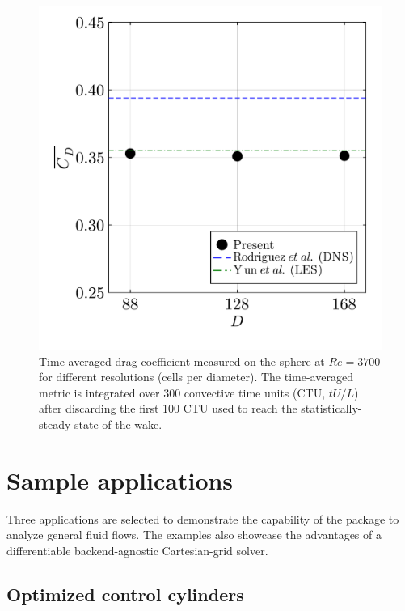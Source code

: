 \documentclass[10pt,a4paper]{article}
\begin{document}
\begin{figure}[!t]
  \centering
  \includegraphics[width=0.4\linewidth]{img/sphere_validation.pdf}
  \vspace*{-0.5cm}
  \caption{Time-averaged drag coefficient measured on the sphere at $Re=3700$ for different resolutions (cells per diameter). The time-averaged metric is integrated over 300 convective time units (CTU, $tU/L$) after discarding the first 100 CTU used to reach the statistically-steady state of the wake.}
  \label{fig:sphere_val}
\end{figure}

\section{Sample applications}\label{sec:applications}
Three applications are selected to demonstrate the capability of the package to analyze general fluid flows. The examples also showcase the advantages of a differentiable backend-agnostic Cartesian-grid solver.

\subsection{Optimized control cylinders}
\end{document}
